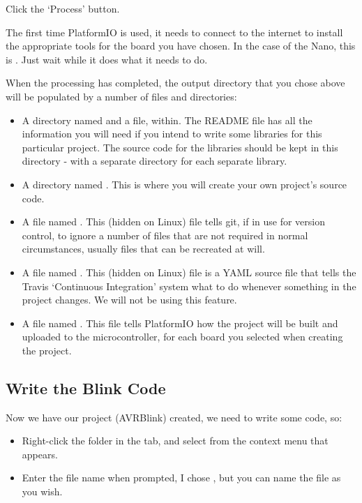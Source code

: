 Click the `Process' button.

The first time PlatformIO is used, it needs to connect to the internet to install the appropriate tools for the board you have chosen. In the case of the Nano, this is . Just wait while it does what it needs to do.

When the processing has completed, the output directory that you chose
above will be populated by a number of files and directories:

\begin{itemize}
\item
  A directory named  and a file,  within.
  The README file has all the information you will need if you intend to
  write some libraries for this particular project. The source code for
  the libraries should be kept in this directory - with a separate directory for each separate library.
\item
  A directory named . This is where you will create your own
  project's source code.
\item
  A file named . This (hidden on Linux) file tells git, if in use for
  version control, to ignore a number of files that are not required in
  normal circumstances, usually files that can be recreated at will.
\item
  A file named . This (hidden on Linux) file is a YAML source file that
  tells the Travis `Continuous Integration' system what to do whenever
  something in the project changes. We will not be using this feature.
\item
  A file named . This file tells PlatformIO how the
  project will be built and uploaded to the microcontroller, for each
  board you selected when creating the project.
\end{itemize}

\subsection{Write the Blink Code}\label{write-the-blink-code}

Now we have our project (AVRBlink) created, we need to write some code, so:

\begin{itemize}
\item
  Right-click the  folder in the  tab, and select
   from the context menu that appears.
\item
  Enter the file name when prompted, I chose , but you can name
  the file as you wish.
\end{itemize}

